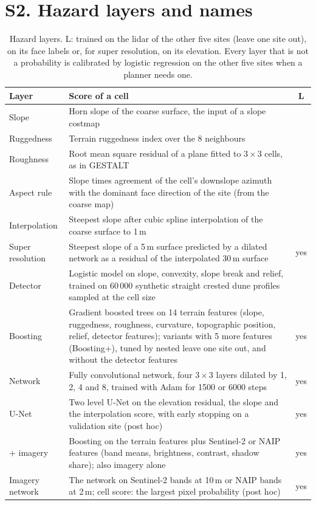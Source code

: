 \documentclass[10pt]{article}
\begin{document}
\section*{S2. Hazard layers and names}
\begin{table}[H]
\caption{Hazard layers. L: trained on the lidar of the other five sites (leave one site out), on its face labels or, for super resolution, on its elevation. Every layer that is not a probability is calibrated by logistic regression on the other five sites when a planner needs one.}
\label{tab:methods_s}
\centering\scriptsize
\setlength{\tabcolsep}{2.5pt}
\begin{tabular}{@{}lp{}c@{}}
\toprule
Layer & Score of a cell & L \\
\midrule
Slope & Horn slope of the coarse surface, the input of a slope costmap & \\
Ruggedness & Terrain ruggedness index over the 8 neighbours & \\
Roughness & Root mean square residual of a plane fitted to $3\times3$ cells, as in GESTALT & \\
Aspect rule & Slope times agreement of the cell's downslope azimuth with the dominant face direction of the site (from the coarse map) & \\
Interpolation & Steepest slope after cubic spline interpolation of the coarse surface to 1\,m & \\
Super resolution & Steepest slope of a 5\,m surface predicted by a dilated network as a residual of the interpolated 30\,m surface & yes \\
Detector & Logistic model on slope, convexity, slope break and relief, trained on 60\,000 synthetic straight crested dune profiles sampled at the cell size & \\
Boosting & Gradient boosted trees on 14 terrain features (slope, ruggedness, roughness, curvature, topographic position, relief, detector features); variants with 5 more features (Boosting+), tuned by nested leave one site out, and without the detector features & yes \\
Network & Fully convolutional network, four $3\times3$ layers dilated by 1, 2, 4 and 8, trained with Adam for 1500 or 6000 steps & yes \\
U-Net & Two level U-Net on the elevation residual, the slope and the interpolation score, with early stopping on a validation site (post hoc) & yes \\
+ imagery & Boosting on the terrain features plus Sentinel-2 or NAIP features (band means, brightness, contrast, shadow share); also imagery alone & yes \\
Imagery network & The network on Sentinel-2 bands at 10\,m or NAIP bands at 2\,m; cell score: the largest pixel probability (post hoc) & yes \\
\bottomrule
\end{tabular}
\end{table}
\end{document}
